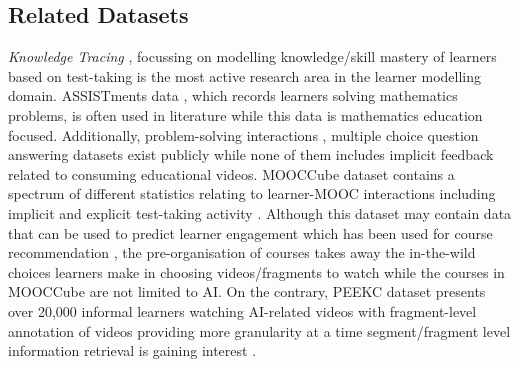 \documentclass[letterpaper]{article} %
\begin{document}
\subsection{Related Datasets}

\emph{Knowledge Tracing} \cite{corbett1994knowledge,deep_kt}, focussing on modelling knowledge/skill mastery of learners based on test-taking is the most active research area in the learner modelling domain. ASSISTments data \cite{assistments_data}, which records learners solving mathematics problems, is often used in literature while this data is mathematics education focused.
Additionally,
problem-solving interactions \cite{choi2020ednet}, multiple choice question answering \cite{wang2020diagnostic,wang2021educational} datasets exist publicly while none of them includes implicit feedback related to consuming educational videos.
MOOCCube dataset contains a spectrum of different statistics relating to learner-MOOC interactions including implicit and explicit test-taking activity \cite{yu2020mooccube}. Although this dataset may contain data that can be used to predict learner engagement which has been used for course recommendation \cite{deng2023knowledge}, the pre-organisation of courses takes away the in-the-wild choices learners make in choosing videos/fragments to watch while the courses in MOOCCube are not limited to AI. On the contrary, PEEKC dataset presents over 20,000 informal learners watching AI-related videos with fragment-level annotation of videos providing more granularity at a time segment/fragment level information retrieval is gaining interest \cite{yu2020spotify}.
\end{document}
